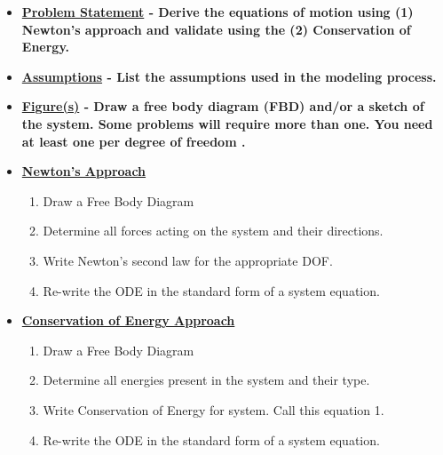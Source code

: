 \documentclass[11pt]{article}
\newcommand{\B}{\color{blue}}
\newcommand{\K}{\color{black}}
\begin{document}
\begin{itemize}
\begin{itemize}
\item \textbf{ \Large \underline{Problem Statement} -  Derive the \B equations of motion \K using (1) Newton's approach and validate using the (2) Conservation of Energy.}\\

\item \textbf{ \Large \underline{Assumptions} - List the assumptions used in the modeling process.  } 


\newpage

\item \textbf{ \Large \underline{Figure(s)} - Draw a \B free body diagram (FBD) \K and/or a sketch of the system. Some problems will require more than one. You need at least one per \B degree of freedom \K.} 

\newpage

\item \textbf{ \Large \underline{Newton's Approach} }\\
\begin{enumerate}
\item Draw a Free Body Diagram \vspace{20mm}\\
\item Determine all \B forces \K acting on the system and their \B directions\K. \vspace{20mm}\\
\item Write \B Newton's second law \K for the appropriate DOF. \vspace{70mm}\\
\item Re-write the ODE in the \B standard form \K of a system equation.
\end{enumerate}

\newpage
\item \textbf{ \Large \underline{Conservation of Energy Approach} }\\
\begin{enumerate}
\item Draw a Free Body Diagram \vspace{20mm}\\
\item Determine all \B energies \K present in the system and their \B type\K. \vspace{20mm}\\
\item Write \B Conservation of Energy \K for system. Call this equation 1.\vspace{70mm}\\
\item Re-write the ODE in the \B standard form \K of a system equation.
\end{enumerate}


\end{itemize}


\end{itemize}


	
\end{document}
